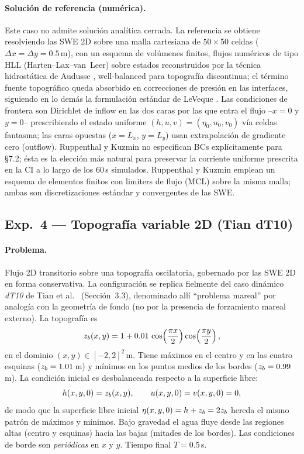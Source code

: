 \paragraph{Solución de referencia (numérica).}
Este caso no admite solución analítica cerrada. La referencia se obtiene
resolviendo las SWE 2D sobre una malla cartesiana de $50\times 50$ celdas
($\Delta x = \Delta y = 0.5$\,m), con un esquema de volúmenes finitos, flujos
numéricos de tipo HLL (Harten--Lax--van~Leer) sobre estados reconstruidos
por la técnica hidrostática de Audusse \cite{audusse2004}, well-balanced
para topografía discontinua; el término fuente topográfico queda absorbido
en correcciones de presión en las interfaces, siguiendo en lo demás la
formulación estándar de LeVeque \cite{leveque2002}. Las condiciones de
frontera son Dirichlet de inflow en las dos caras por las que entra el
flujo --$x = 0$ y $y = 0$-- prescribiendo el estado uniforme
$(h, u, v) = (\eta_0, u_0, v_0)$ vía celdas fantasma; las caras opuestas
($x = L_x$, $y = L_y$) usan extrapolación de gradiente cero (outflow).
Ruppenthal y Kuzmin no especifican BCs explícitamente para §7.2; ésta
es la elección más natural para preservar la corriente uniforme
prescrita en la CI a lo largo de los 60\,s simulados. Ruppenthal y Kuzmin emplean un esquema de
elementos finitos con limiters de flujo (MCL) sobre la misma malla; ambas
son discretizaciones estándar y convergentes de las SWE.

\subsection{Exp.\ 4 --- Topografía variable 2D (Tian dT10)}
\label{app:exp4}

\paragraph{Problema.}
Flujo 2D transitorio sobre una topografía oscilatoria, gobernado por las SWE
2D en forma conservativa. La configuración se replica fielmente del caso
dinámico \emph{dT10} de Tian et al.\ \cite{tian2025} (Sección~3.3),
denominado allí ``problema mareal'' por analogía con la geometría de fondo
(no por la presencia de forzamiento mareal externo). La topografía es
\begin{equation}
  z_b(x,y) = 1 + 0{.}01\,\cos\!\left(\frac{\pi x}{2}\right)
                          \cos\!\left(\frac{\pi y}{2}\right),
\end{equation}
en el dominio $(x,y) \in [-2, 2]^2$\,m. Tiene máximos en el centro y en las
cuatro esquinas ($z_b = 1{.}01$\,m) y mínimos en los puntos medios de los
bordes ($z_b = 0{.}99$\,m). La condición inicial es desbalanceada respecto a
la superficie libre:
\begin{equation}
  h(x,y,0) = z_b(x,y), \qquad u(x,y,0) = v(x,y,0) = 0,
\end{equation}
de modo que la superficie libre inicial $\eta(x,y,0) = h + z_b = 2z_b$ hereda
el mismo patrón de máximos y mínimos. Bajo gravedad el agua fluye desde las
regiones altas (centro y esquinas) hacia las bajas (mitades de los bordes).
Las condiciones de borde son \emph{periódicas} en $x$ y $y$. Tiempo final
$T = 0{.}5$\,s.

